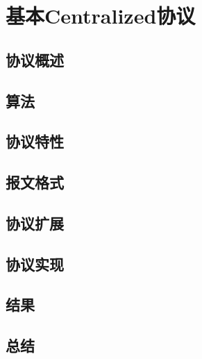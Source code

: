 \section{基本Centralized协议}
\subsection{协议概述} %
	\label{sub:协议概述}
	
	\subsection{算法} %
	\label{sub:算法}
	
	\subsection{协议特性} %
	\label{sub:协议特性}
	
	\subsection{报文格式} %
	\label{sub:报文格式}
	
	\subsection{协议扩展} %
	\label{sub:协议扩展}
	
	\subsection{协议实现} %
	\label{sub:协议实现}
	
	\subsection{结果} %
	\label{sub:结果}
	
	\subsection{总结} %
	\label{sub:总结}
	
